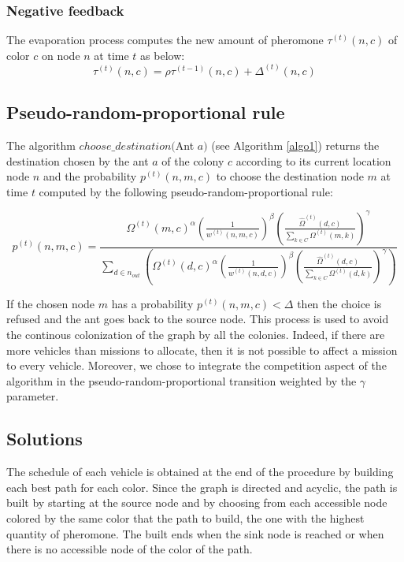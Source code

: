 \documentclass[a4paper,10pt]{article}
\begin{document}
\subsubsection{Negative feedback}
The evaporation process computes the new amount of pheromone $\tau^{(t)}(n,c)$ of color $c$ on node $n$ at time $t$ as below:
\begin{equation*}
 \tau^{(t)}(n,c) = \rho \tau^{(t-1)}(n,c) + \Delta^{(t)}(n,c)
\end{equation*}

\subsection{Pseudo-random-proportional rule}
The algorithm $choose\_destination($Ant $a)$ (see Algorithm \ref{algo1}) returns the destination chosen by the ant $a$ of the colony $c$ according to its current location node $n$ and the probability $p^{(t)}(n,m,c)$ to choose the destination node $m$ at time $t$ computed by the following pseudo-random-proportional rule:

\begin{equation*}
  p^{(t)}(n,m,c) = \frac
    {
      \Omega^{(t)}(m,c)^{\alpha}
      \left( \frac{1}{w^{(t)}(n,m,c)} \right) ^{\beta}
      \left( \frac{\hat \Omega^{(t)}(d,c)}{\sum_{k \in C} \Omega^{(t)}(m,k)} \right)^{\gamma}
    }
    {
      \sum_{d \in n_{out}} \left(
	\Omega^{(t)}(d,c)^{\alpha}
	\left( \frac{1}{w^{(t)}(n,d,c)} \right)^{\beta}
	\left( \frac{\hat \Omega^{(t)}(d,c)}{\sum_{k \in C} \Omega^{(t)}(d,k)} \right)^{\gamma}
      \right)
    }
\end{equation*}

If the chosen node $m$ has a probability $p^{(t)}(n,m,c) < \Delta$ then the choice is refused and the ant goes back to the source node. This process is used to avoid the continous colonization of the graph by all the colonies. Indeed, if there are more vehicles than missions to allocate, then it is not possible to affect a mission to every vehicle. Moreover, we chose to integrate the competition aspect of the algorithm in the pseudo-random-proportional transition weighted by the $\gamma$ parameter.

\subsection{Solutions}
The schedule of each vehicle is obtained at the end of the procedure by building each best path for each color. Since the graph is directed and acyclic, the path is built by starting at the source node and by choosing from each accessible node colored by the same color that the path to build, the one with the highest quantity of pheromone. The built ends when the sink node is reached or when there is no accessible node of the color of the path.
\end{document}
